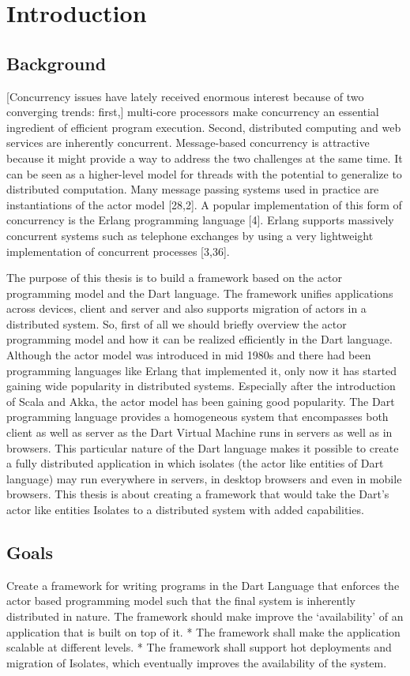 \chapter{Introduction}\label{chapter:introduction}

\section{Background}
[Concurrency issues have lately received enormous interest because of two converging trends: first,] multi-core processors make concurrency an essential ingredient of efficient program execution. Second, distributed computing and web services are inherently concurrent. Message-based concurrency is attractive because it might provide a way to address the two challenges at the same time. It can be seen as a higher-level model for threads with the potential to generalize to distributed computation. Many message passing systems used in practice are instantiations of the actor model [28,2]. A popular implementation of this form of concurrency is the Erlang programming language [4]. Erlang supports massively concurrent systems such as telephone exchanges by using a very lightweight implementation of concurrent processes [3,36].~\parencite{Haller}

The purpose of this thesis is to build a framework based on the actor programming model and the Dart language. The framework unifies applications across devices, client and server and also supports migration of actors in a distributed system. So, first of all we should briefly overview the actor programming model and how it can be realized efficiently in the Dart language. Although the actor model was introduced in mid 1980s and there had been programming languages like Erlang that implemented it, only now it has started gaining wide popularity in distributed systems. Especially after the introduction of Scala and Akka, the actor model has been gaining good popularity. The Dart programming language provides a homogeneous system that encompasses both client as well as server as the Dart Virtual Machine runs in servers as well as in browsers. This particular nature of the Dart language makes it possible to create a fully distributed application in which isolates (the actor like entities of Dart language) may run everywhere \textemdash{} in servers, in desktop browsers and even in mobile browsers.
This thesis is about creating a framework that would take the Dart's actor like entities \textemdash{} Isolates to a distributed system with added capabilities.

\section{Goals}
Create a framework for writing programs in the Dart Language that enforces the actor based programming model such that the final system is inherently distributed in nature.
The framework should make improve the ‘availability’ of an application that is built on top of it.
* The framework shall make the application scalable at different levels.
* The framework shall support hot deployments and migration of Isolates, which eventually improves the availability of the system.
